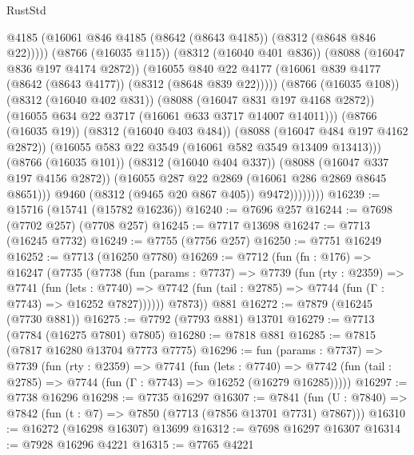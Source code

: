 \begin{lexlean}{RustStd}
\begin{coremodule}
                                @4185
                                (@16061 @846 @4185 (@8642 (@8643 @4185)) (@8312 (@8648 @846 @22)))))
                            (@8766 (@16035 @115))
                            (@8312 (@16040 @401 @836))
                            (@8088 (@16047 @836 @197 @4174 @2872))
                            (@16055
                              @840
                              @22
                              @4177
                              (@16061 @839 @4177 (@8642 (@8643 @4177)) (@8312 (@8648 @839 @22)))))
                          (@8766 (@16035 @108))
                          (@8312 (@16040 @402 @831))
                          (@8088 (@16047 @831 @197 @4168 @2872))
                          (@16055 @634 @22 @3717 (@16061 @633 @3717 @14007 @14011)))
                        (@8766 (@16035 @19))
                        (@8312 (@16040 @403 @484))
                        (@8088 (@16047 @484 @197 @4162 @2872))
                        (@16055 @583 @22 @3549 (@16061 @582 @3549 @13409 @13413)))
                      (@8766 (@16035 @101))
                      (@8312 (@16040 @404 @337))
                      (@8088 (@16047 @337 @197 @4156 @2872))
                      (@16055 @287 @22 @2869 (@16061 @286 @2869 @8645 @8651)))
                    @9460
                    (@8312 (@9465 @20 @867 @405))
                    @9472))))))))
@16239 := @15716 (@15741 (@15782 @16236))
@16240 := @7696 @257
@16244 := @7698 (@7702 @257) (@7708 @257)
@16245 := @7717 @13698
@16247 := @7713 (@16245 @7732)
@16249 := @7755 (@7756 @257)
@16250 := @7751 @16249
@16252 := @7713 (@16250 @7780)
@16269 := @7712
    (fun (fn : @176) =>
    @16247
      (@7735
        (@7738
          (fun (params : @7737) =>
          @7739
            (fun (rty : @2359) =>
            @7741
              (fun (lets : @7740) =>
              @7742 (fun (tail : @2785) => @7744 (fun (Γ : @7743) => @16252 @7827))))))
        @7873))
    @881
@16272 := @7879 (@16245 (@7730 @881))
@16275 := @7792 (@7793 @881) @13701
@16279 := @7713 (@7784 (@16275 @7801) @7805)
@16280 := @7818 @881
@16285 := @7815 (@7817 @16280 @13704 @7773 @7775)
@16296 := fun (params : @7737) =>
  @7739
    (fun (rty : @2359) =>
    @7741
      (fun (lets : @7740) =>
      @7742 (fun (tail : @2785) => @7744 (fun (Γ : @7743) => @16252 (@16279 @16285)))))
@16297 := @7738 @16296
@16298 := @7735 @16297
@16307 := @7841
    (fun (U : @7840) => @7842 (fun (t : @7) => @7850 (@7713 (@7856 @13701 @7731) @7867)))
@16310 := @16272 (@16298 @16307) @13699
@16312 := @7698 @16297 @16307
@16314 := @7928 @16296 @4221
@16315 := @7765 @4221

\end{coremodule}
\end{lexlean}
